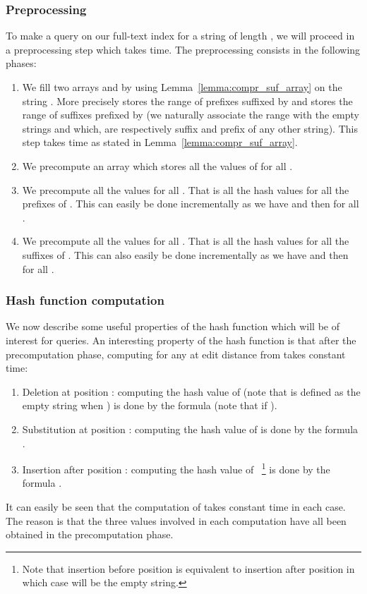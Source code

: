 \documentclass{article}
\newcommand{\?}{\mskip1.5mu}
\begin{document}
\subsubsection{Preprocessing}
To make a query on our full-text index for a string  of length , we will proceed in a preprocessing step which takes  time. The preprocessing consists in the following phases: 
\begin{enumerate}
\item We fill two arrays  and  by using Lemma~\ref{lemma:compr_suf_array} on the string . More precisely  stores the range of prefixes suffixed by  and  stores the range of suffixes prefixed by  (we naturally associate the range  with the empty strings  and  which, are respectively suffix and prefix of any other string). This step takes time  as stated in Lemma~\ref{lemma:compr_suf_array}. 
\item We precompute an array which stores all the values of  for all .
\item We precompute all the values  for all . That is all the hash values for all the prefixes of . This can easily be done incrementally as we have  and then  for all . 
\item We precompute all the values  for all . That is all the hash values for all the suffixes of . This can also easily be done incrementally as we have  and then  for all . 
\end{enumerate}

\subsubsection{Hash function computation}
We now describe some useful properties of the hash function  which will be of interest for queries. 
An interesting property of the hash function  is that after the precomputation phase, computing  for any  at edit distance  from  takes constant time:
\begin{enumerate}
\item Deletion at position : computing the hash value of  (note that  is defined as the empty string when ) is done by the formula  (note that  if ). 
\item Substitution at position : computing the hash value of  is done by the formula . 
\item Insertion after position : computing the hash value of ~\footnote{Note that insertion before position  is equivalent to insertion after position  in which case  will be the empty string.} is done by the formula .
\end{enumerate}
It can easily be seen that the computation of  takes constant time in each case. The reason is that the three values involved in each computation have all been obtained in the precomputation phase. 
\end{document}
